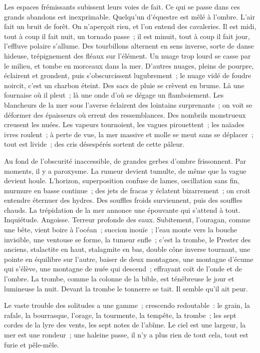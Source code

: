 \documentclass[french,twoside]{book} %
\begin{document}
Les espaces frémissants subissent leurs voies de fait. Ce qui se passe dans ces grands abandons est inexprimable. Quelqu’un d’équestre est mêlé à l’ombre. L’air fait un bruit de forêt. On n’aperçoit rien, et l’on  entend des cavaleries. Il est midi, tout à coup il fait nuit, un tornado passe ; il est minuit, tout à coup il fait jour, l’effluve polaire s’allume. Des tourbillons alternent en sens inverse, sorte de danse hideuse, trépignement des fléaux sur l’élément. Un nuage trop lourd se casse par le milieu, et tombe en morceaux dans la mer. D’autres nuages, pleins de pourpre, éclairent et grondent, puis s’obscurcissent lugubrement ; le nuage vidé de foudre noircit, c’est un charbon éteint. Des sacs de pluie se crèvent en brume. Là une fournaise où il pleut ; là une onde d’où se dégage un flamboiement. Les blancheurs de la mer sous l’averse éclairent des lointains surprenants ; on voit se déformer des épaisseurs où errent des ressemblances. Des nombrils monstrueux creusent les nuées. Les vapeurs tournoient, les vagues pirouettent ; les naïades ivres roulent ; à perte de vue, la mer massive et molle se meut sans se déplacer ; tout est livide ; des cris désespérés sortent de cette pâleur.\par
Au fond de l’obscurité inaccessible, de grandes gerbes d’ombre frissonnent. Par moments, il y a paroxysme. La rumeur devient tumulte, de même que la vague devient houle. L’horizon, superposition confuse de lames, oscillation sans fin, murmure en basse continue ; des jets de fracas y éclatent bizarrement ; on croit entendre éternuer des hydres. Des souffles froids surviennent, puis des souffles chauds. La trépidation de la mer annonce une épouvante qui s’attend à tout. Inquiétude. Angoisse. Terreur profonde des eaux. Subitement, l’ouragan, comme une bête, vient boire à  l’océan ; succion inouïe ; l’eau monte vers la bouche invisible, une ventouse se forme, la tumeur enfle ; c’est la trombe, le Prester des anciens, stalactite en haut, stalagmite en bas, double cône inverse tournant, une pointe en équilibre sur l’autre, baiser de deux montagnes, une montagne d’écume qui s’élève, une montagne de nuée qui descend ; effrayant coït de l’onde et de l’ombre. La trombe, comme la colonne de la bible, est ténébreuse le jour et lumineuse la nuit. Devant la trombe le tonnerre se tait. Il semble qu’il ait peur.\par
Le vaste trouble des solitudes a une gamme ; crescendo redoutable : le grain, la rafale, la bourrasque, l’orage, la tourmente, la tempête, la trombe ; les sept cordes de la lyre des vents, les sept notes de l’abîme. Le ciel est une largeur, la mer est une rondeur ; une haleine passe, il n’y a plus rien de tout cela, tout est furie et pêle-mêle.\par
\end{document}
